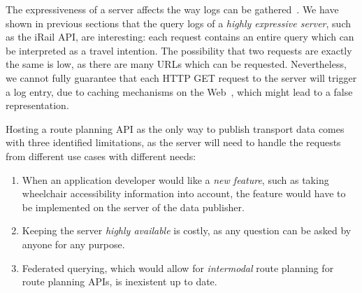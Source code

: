 \documentclass{sig-alternate}
\begin{document}
%

The expressiveness of a server affects the way logs can be gathered~\cite{usewod2015}.
We have shown in previous sections that the query logs of a \emph{highly expressive server}, such as the iRail API, are interesting: each request contains an entire query which can be interpreted as a travel intention.
The possibility that two requests are exactly the same is low, as there are many URLs which can be requested.
Nevertheless, we cannot fully guarantee that each HTTP GET request to the server will trigger a log entry, due to caching mechanisms on the Web~\cite{fielding}, which might lead to a false representation.

Hosting a route planning API as the only way to publish transport data comes with three identified limitations, as the server will need to handle the requests from different use cases with different needs:
\begin{enumerate}
  \item When an application developer would like a \emph{new feature}, such as taking wheelchair accessibility information into account, the feature would have to be implemented on the server of the data publisher.
  \item Keeping the server \emph{highly available} is costly, as any question can be asked by anyone for any purpose.
  \item Federated querying, which would allow for \emph{intermodal} route planning for route planning APIs, is inexistent up to date.
\end{enumerate}
\end{document}
